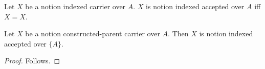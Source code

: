 

\begin{definition}\label{notion_indexed_accepted}
    Let $X$ be a notion indexed carrier over $A$.
    $X$ is notion indexed accepted over $A$ iff $X=X$.
\end{definition}

\begin{proposition}\label{notion_constructed_parent_view_missing}
    Let $X$ be a notion constructed-parent carrier over $A$.
    Then $X$ is notion indexed accepted over $\{A\}$.
\end{proposition}
\begin{proof}
    Follows.
\end{proof}

